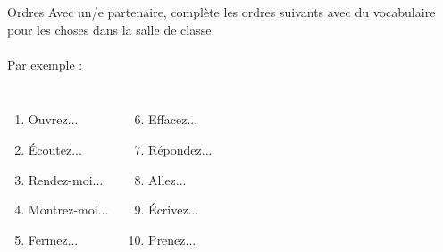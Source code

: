 \begin{frame}{Ordres }
  Avec un/e partenaire, complète les ordres suivants avec du vocabulaire pour les choses dans la salle de classe. \\
   \\
  Par exemple : 
  \begin{columns}
      \begin{enumerate}
        \item Ouvrez...
        \item Écoutez...
        \item Rendez-moi...
        \item Montrez-moi...
        \item Fermez...
      \end{enumerate}
      \begin{enumerate}
        \setcounter{enumi}{5}
        \item Effacez...
        \item Répondez...
        \item Allez...
        \item Écrivez...
        \item Prenez...
      \end{enumerate}
  \end{columns}
\end{frame}